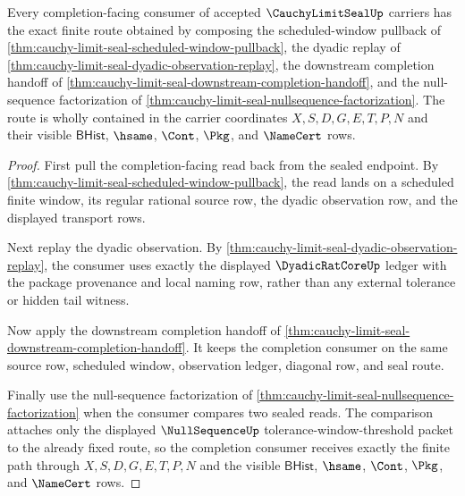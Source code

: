 \begin{theorem}
\label{thm:cauchy-limit-seal-completion-consumer-exactness}
Every completion-facing consumer of accepted $\CauchyLimitSealUp$ carriers has the exact finite route obtained by composing the scheduled-window pullback of \autoref{thm:cauchy-limit-seal-scheduled-window-pullback}, the dyadic replay of \autoref{thm:cauchy-limit-seal-dyadic-observation-replay}, the downstream completion handoff of \autoref{thm:cauchy-limit-seal-downstream-completion-handoff}, and the null-sequence factorization of \autoref{thm:cauchy-limit-seal-nullsequence-factorization}. The route is wholly contained in the carrier coordinates $X,S,D,G,E,T,P,N$ and their visible $\mathsf{BHist}$, $\hsame$, $\Cont$, $\Pkg$, and $\NameCert$ rows.
\end{theorem}
\begin{proof}
First pull the completion-facing read back from the sealed endpoint. By \autoref{thm:cauchy-limit-seal-scheduled-window-pullback}, the read lands on a scheduled finite window, its regular rational source row, the dyadic observation row, and the displayed transport rows.

Next replay the dyadic observation. By \autoref{thm:cauchy-limit-seal-dyadic-observation-replay}, the consumer uses exactly the displayed $\DyadicRatCoreUp$ ledger with the package provenance and local naming row, rather than any external tolerance or hidden tail witness.

Now apply the downstream completion handoff of \autoref{thm:cauchy-limit-seal-downstream-completion-handoff}. It keeps the completion consumer on the same source row, scheduled window, observation ledger, diagonal row, and seal route.

Finally use the null-sequence factorization of \autoref{thm:cauchy-limit-seal-nullsequence-factorization} when the consumer compares two sealed reads. The comparison attaches only the displayed $\NullSequenceUp$ tolerance-window-threshold packet to the already fixed route, so the completion consumer receives exactly the finite path through $X,S,D,G,E,T,P,N$ and the visible $\mathsf{BHist}$, $\hsame$, $\Cont$, $\Pkg$, and $\NameCert$ rows.
\end{proof}


